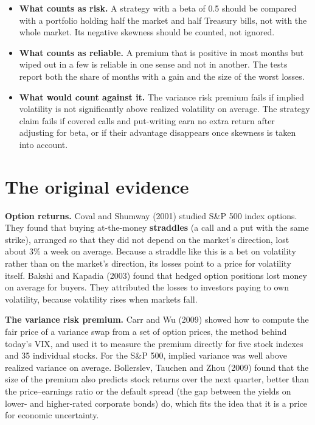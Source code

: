 \begin{itemize}
  \item \textbf{What counts as risk.} A strategy with a beta of 0.5 should be compared with a portfolio holding half the market and half Treasury bills, not with the whole market. Its negative skewness should be counted, not ignored.
  \item \textbf{What counts as reliable.} A premium that is positive in most months but wiped out in a few is reliable in one sense and not in another. The tests report both the share of months with a gain and the size of the worst losses.
  \item \textbf{What would count against it.} The variance risk premium fails if implied volatility is not significantly above realized volatility on average. The strategy claim fails if covered calls and put-writing earn no extra return after adjusting for beta, or if their advantage disappears once skewness is taken into account.
\end{itemize}

\section{The original evidence}
\label{sec:16-evidence}

\textbf{Option returns.} Coval and Shumway (2001) studied S\&P 500 index options. They found that buying at-the-money \textbf{straddles} (a call and a put with the same strike), arranged so that they did not depend on the market's direction, lost about 3\% a week on average. Because a straddle like this is a bet on volatility rather than on the market's direction, its losses point to a price for volatility itself. Bakshi and Kapadia (2003) found that hedged option positions lost money on average for buyers. They attributed the losses to investors paying to own volatility, because volatility rises when markets fall.

\textbf{The variance risk premium.} Carr and Wu (2009) showed how to compute the fair price of a variance swap from a set of option prices, the method behind today's VIX, and used it to measure the premium directly for five stock indexes and 35 individual stocks. For the S\&P 500, implied variance was well above realized variance on average. Bollerslev, Tauchen and Zhou (2009) found that the size of the premium also predicts stock returns over the next quarter, better than the price--earnings ratio or the default spread (the gap between the yields on lower- and higher-rated corporate bonds) do, which fits the idea that it is a price for economic uncertainty.

